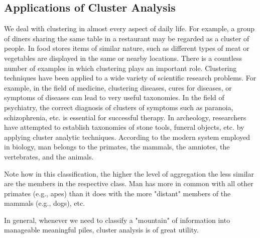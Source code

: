 \documentclass[a4paper,12pt]{article}
\begin{document}
\subsection{Applications of Cluster Analysis}

We deal with clustering in almost every aspect of daily life. For example, a group of diners sharing the same table in a restaurant may be regarded as a cluster of people. In food stores items of similar nature, such as different types of meat or vegetables are displayed in the same or nearby locations. There is a countless number of examples in which clustering plays an important role. Clustering techniques have been applied to a wide variety of scientific research problems. For example, in the field of medicine, clustering diseases, cures for diseases, or symptoms of diseases can lead to very useful taxonomies. In the field of psychiatry, the correct diagnosis of clusters of symptoms such as paranoia, schizophrenia, etc. is essential for successful therapy. In archeology, researchers have attempted to establish taxonomies of stone tools, funeral objects, etc. by applying cluster analytic techniques. According to the modern system employed in biology, man belongs to the primates, the mammals, the amniotes, the vertebrates, and the animals.

Note how in this classification, the higher the level of aggregation the less similar are the members in the respective class. Man has more in common with all other primates (e.g., apes) than it does with the more "distant" members of the mammals (e.g., dogs), etc.

In general, whenever we need to classify a "mountain" of information into manageable meaningful piles, cluster analysis is of great utility.


\end{document}
